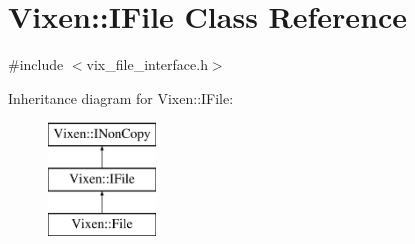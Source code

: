 \hypertarget{class_vixen_1_1_i_file}{}\section{Vixen\+:\+:I\+File Class Reference}
\label{class_vixen_1_1_i_file}


{\ttfamily \#include $<$vix\+\_\+file\+\_\+interface.\+h$>$}

Inheritance diagram for Vixen\+:\+:I\+File\+:\begin{figure}[H]
\begin{center}
\leavevmode
\includegraphics[height=3.000000cm]{class_vixen_1_1_i_file}
\end{center}
\end{figure}
